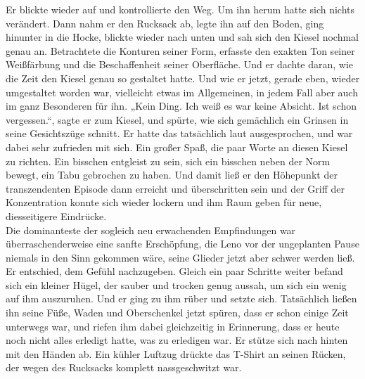 \documentclass[ngerman,smalldemyvopaper,11pt,oneside,onecolumn,openright,extrafontsizes]{memoir}
\begin{document}
Er blickte wieder auf und kontrollierte den Weg. Um ihn herum hatte sich nichts verändert. Dann nahm er den Rucksack ab, legte ihn auf den Boden, ging hinunter in die Hocke, blickte wieder nach unten und sah sich den Kiesel nochmal genau an. Betrachtete die Konturen seiner Form, erfasste den exakten Ton seiner Weißfärbung und die Beschaffenheit seiner Oberfläche. Und er dachte daran, wie die Zeit den Kiesel genau so gestaltet hatte. Und wie er jetzt, gerade eben, wieder umgestaltet worden war, vielleicht etwas im Allgemeinen, in jedem Fall aber auch im ganz Besonderen für ihn.
„Kein Ding. Ich weiß es war keine Absicht. Ist schon vergessen.“, sagte er zum Kiesel, und spürte, wie sich gemächlich ein Grinsen in seine Gesichtszüge schnitt. Er hatte das tatsächlich laut ausgesprochen, und war dabei sehr zufrieden mit sich. Ein großer Spaß, die paar Worte an diesen Kiesel zu richten. Ein bisschen entgleist zu sein, sich ein bisschen neben der Norm bewegt, ein Tabu gebrochen zu haben. Und damit ließ er den Höhepunkt der transzendenten Episode dann erreicht und überschritten sein und der Griff der Konzentration konnte sich wieder lockern und ihm Raum geben für neue, diesseitigere Eindrücke.
\vspace{0.5em} \\
Die dominanteste der sogleich neu erwachenden Empfindungen war überraschenderweise eine sanfte Erschöpfung, die Leno vor der ungeplanten Pause niemals in den Sinn gekommen wäre, seine Glieder jetzt aber schwer werden ließ. Er entschied, dem Gefühl nachzugeben. Gleich ein paar Schritte weiter befand sich ein kleiner Hügel, der sauber und trocken genug aussah, um sich ein wenig auf ihm auszuruhen. Und er ging zu ihm rüber und setzte sich. Tatsächlich ließen ihn seine Füße, Waden und Oberschenkel jetzt spüren, dass er schon einige Zeit unterwegs war, und riefen ihm dabei gleichzeitig in Erinnerung, dass er heute noch nicht alles erledigt hatte, was zu erledigen war. Er stütze sich nach hinten mit den Händen ab. Ein kühler Luftzug drückte das T-Shirt an seinen Rücken, der wegen des Rucksacks komplett nassgeschwitzt war.\\
\end{document}
